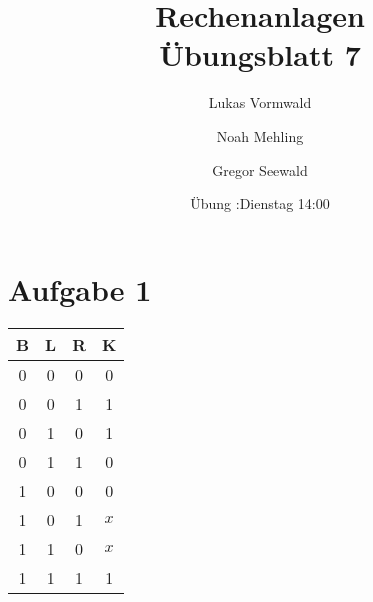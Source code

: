 \documentclass[11pt,a4paper]{article}
\title{Rechenanlagen\\Übungsblatt 7}
\author{Lukas Vormwald \and Noah Mehling \and Gregor Seewald}
\date{Übung :Dienstag 14:00}
\newcommand{\Aufgabe}[1]{\section{Aufgabe #1}}
\begin{document}
\maketitle

  \Aufgabe{1}

    \begin{tabular}{|c|c|c||c|}\hline
      B&L&R&K\\ \hline \hline
      0&0&0&0\\ \hline
      0&0&1&1\\ \hline
      0&1&0&1\\ \hline
      0&1&1&0\\ \hline
      1&0&0&0\\ \hline
      1&0&1&$x$\\ \hline
      1&1&0&$x$\\ \hline
      1&1&1&1\\ \hline

    \end{tabular}
\end{document}
